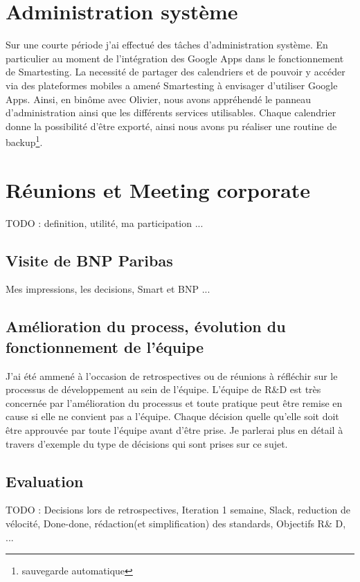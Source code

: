 \section{Administration système}
Sur une courte période j'ai effectué des t\^aches d'administration système. En particulier au moment de l'intégration des Google Apps dans le fonctionnement de Smartesting. La necessité de partager des calendriers et de pouvoir y accéder via des plateformes mobiles a amené Smartesting à envisager d'utiliser Google Apps. Ainsi, en binôme avec Olivier, nous avons appréhendé le panneau d'administration ainsi que les différents services utilisables. Chaque calendrier donne la possibilité d'être exporté, ainsi nous avons pu réaliser une routine de backup\footnote{sauvegarde automatique}.

\section{Réunions et Meeting corporate}

TODO : definition, utilité, ma participation ...

\subsection{Visite de BNP Paribas}
Mes impressions, les decisions, Smart et BNP ...

\subsection{Amélioration du process, évolution du fonctionnement de l'équipe}
J'ai été ammené à l'occasion de retrospectives ou de réunions à réfléchir sur le processus de développement au sein de l'équipe. L'équipe de R\&D est très concernée par l'amélioration du processus et toute pratique peut être remise en cause si elle ne convient pas a l'équipe. Chaque décision quelle qu'elle soit doit être approuvée par toute l'équipe avant d'être prise. Je parlerai plus en détail à travers d'exemple du type de décisions qui sont prises sur ce sujet.

\subsection{Evaluation}





TODO : Decisions lors de retrospectives, Iteration 1 semaine, Slack, reduction de vélocité, Done-done, rédaction(et simplification) des standards, Objectifs R\& D, ...
